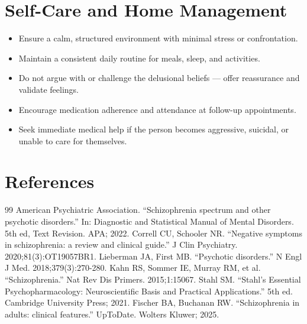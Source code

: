 \section*{Self-Care and Home Management}
\begin{itemize}
  \item Ensure a calm, structured environment with minimal stress or confrontation.
  \item Maintain a consistent daily routine for meals, sleep, and activities.
  \item Do not argue with or challenge the delusional beliefs — offer reassurance and validate feelings.
  \item Encourage medication adherence and attendance at follow-up appointments.
  \item Seek immediate medical help if the person becomes aggressive, suicidal, or unable to care for themselves.
\end{itemize}

\section*{References}
\begin{thebibliography}{99}
 American Psychiatric Association. ``Schizophrenia spectrum and other psychotic disorders.'' In: Diagnostic and Statistical Manual of Mental Disorders. 5th ed, Text Revision. APA; 2022.
 Correll CU, Schooler NR. ``Negative symptoms in schizophrenia: a review and clinical guide.'' J Clin Psychiatry. 2020;81(3):OT19057BR1.
 Lieberman JA, First MB. ``Psychotic disorders.'' N Engl J Med. 2018;379(3):270-280.
 Kahn RS, Sommer IE, Murray RM, et al. ``Schizophrenia.'' Nat Rev Dis Primers. 2015;1:15067.
 Stahl SM. ``Stahl's Essential Psychopharmacology: Neuroscientific Basis and Practical Applications.'' 5th ed. Cambridge University Press; 2021.
 Fischer BA, Buchanan RW. ``Schizophrenia in adults: clinical features.'' UpToDate. Wolters Kluwer; 2025.
\end{thebibliography}
